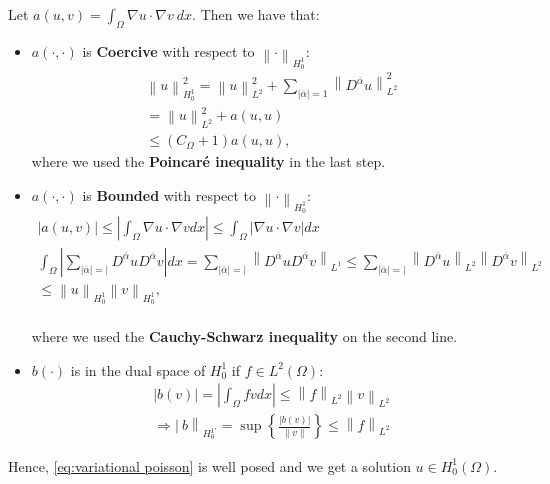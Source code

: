 \documentclass[../Main/main.tex]{subfiles}
\begin{document}
	\begin{example}
		Let $a(u,v) = \int_{\Omega}\nabla u \cdot \nabla v \ dx$. Then we have that:
		\begin{itemize}
			\item $a(\cdot,\cdot)$ is \textbf{Coercive} with respect to $\left \| \cdot \right \|_{H_0^1}$:
			\begin{equation*}
				\begin{gathered}
					\left \| u \right \|^2_{H_0^1} = \left \| u \right \|^2_{L^2} + \sum_{|\overline{\alpha}|=1} \left \| D^{\overline{\alpha}} u \right \|^2_{L^2}\\
					=\left \|u\right \|^2_{L^2} + a(u,u) \\
					\leq (C_{\Omega} + 1)a(u,u),
				\end{gathered}
			\end{equation*}
			where we used the \textbf{Poincaré inequality} in the last step.
			\item $a(\cdot,\cdot)$ is \textbf{Bounded} with respect to $\left \| \cdot \right \|_{H_0^1}$:
			\begin{equation*}
				\begin{gathered}
					|a(u,v)|\leq \left |\int_{\Omega}\nabla u \cdot \nabla v dx \right | \leq \int_{\Omega} |\nabla u \cdot \nabla v| dx \\
					\int_{\Omega} |\sum_{|\overline{\alpha}|=|}D^{\overline{\alpha}}u D^{\overline{\alpha}}v|dx=\sum_{|\overline{\alpha}|=|} \left \| D^{\overline{\alpha}}u D^{\overline{\alpha}}v \right \|_{L^1} \leq \sum_{|\overline{\alpha}|=|} \left \| D^{\overline{\alpha}}u \right \|_{L^2} \left \| D^{\overline{\alpha}}v \right \|_{L^2} \\
					\leq \left \|u \right \|_{H_0^1} \left \| v \right \|_{H_0^1},
				\end{gathered}
			\end{equation*}\\
		where we used the \textbf{Cauchy-Schwarz inequality} on the second line.
		\item  $b(\cdot)$ is in the dual space of $H_0^1$ if  $f\in L^2(\Omega)$:
		\begin{equation*}
			\begin{gathered}
				|b(v)| = |\int_{\Omega} fv dx | \leq \left \|f \right \|_{L^2} \left \| v \right \|_{L^2} \\
				\Rightarrow \left |\ b \right \|_{H_0^{1'}} = \sup\left \{ \frac{|b(v)|}{\left \| v \right \|} \right \} \leq \left \| f \right \|_{L^2}
			\end{gathered}
		\end{equation*}
		\end{itemize}
		Hence, \eqref{eq:variational poisson} is well posed and we get a solution $u \in H_0^1(\Omega)$.
	\end{example}
\end{document}
